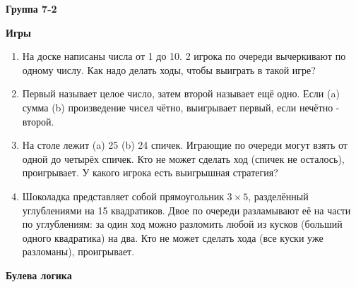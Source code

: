 \documentclass{article}
\begin{document}
\large


\begin{center}
\textbf{Группа 7-2}
\end{center}

\begin{center}
	\textbf{Игры}
\end{center}

\begin{enumerate}[label*=\protect\fbox{\arabic{enumi}}]
	
	\item На доске написаны числа от 1 до 10. 2 игрока по очереди вычеркивают по одному числу. Как надо делать ходы, чтобы выиграть в такой игре?
	
	\item Первый называет целое число, затем второй называет ещё одно. Если (a) сумма (b) произведение чисел чётно, выигрывает первый, если нечётно - второй.
	
	\item На столе лежит (a) 25 (b) 24 спичек. Играющие по очереди могут взять от одной до четырёх спичек. Кто не может сделать ход (спичек не осталось), проигрывает. У какого игрока есть выигрышная стратегия?
	
	\item Шоколадка представляет собой прямоугольник $3 \times 5$, разделённый углублениями на 15 квадратиков. Двое по очереди разламывают её на части по углублениям: за один ход можно разломить любой из кусков (больший одного квадратика) на два. Кто не может сделать хода (все куски уже разломаны), проигрывает.
	
\end{enumerate}

\begin{center}
	\textbf{Булева логика}
\end{center}
\end{document}

